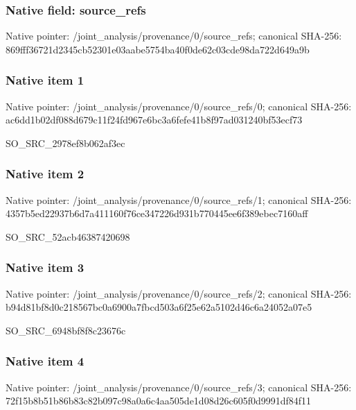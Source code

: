 \documentclass[10pt,a4paper]{article}
\begin{document}
\subsubsection{Native field: source\_\allowbreak{}refs}
Native pointer: /joint\_\allowbreak{}analysis/provenance/0/source\_\allowbreak{}refs; canonical SHA-256: 869fff36721d2345cb52301e03aabe5754ba40f0de62c03cde98da722d649a9b

\subsubsection{Native item 1}
Native pointer: /joint\_\allowbreak{}analysis/provenance/0/source\_\allowbreak{}refs/0; canonical SHA-256: ac6dd1b02df088d679c11f24fd967e6bc3a6fefe41b8f97ad031240bf53ecf73

\begingroup\raggedright\sloppy SO\_\allowbreak{}SRC\_\allowbreak{}2978ef8b062af3ec\par\endgroup

\subsubsection{Native item 2}
Native pointer: /joint\_\allowbreak{}analysis/provenance/0/source\_\allowbreak{}refs/1; canonical SHA-256: 4357b5ed22937b6d7a411160f76ce347226d931b770445ee6f389ebec7160aff

\begingroup\raggedright\sloppy SO\_\allowbreak{}SRC\_\allowbreak{}52acb46387420698\par\endgroup

\subsubsection{Native item 3}
Native pointer: /joint\_\allowbreak{}analysis/provenance/0/source\_\allowbreak{}refs/2; canonical SHA-256: b94d81bf8d0c218567bc0a6900a7fbcd503a6f25e62a5102d46c6a24052a07e5

\begingroup\raggedright\sloppy SO\_\allowbreak{}SRC\_\allowbreak{}6948bf8f8c23676c\par\endgroup

\subsubsection{Native item 4}
Native pointer: /joint\_\allowbreak{}analysis/provenance/0/source\_\allowbreak{}refs/3; canonical SHA-256: 72f15b8b51b86b83c82b097c98a0a6c4aa505de1d08d26c605f0d9991df84f11
\end{document}
